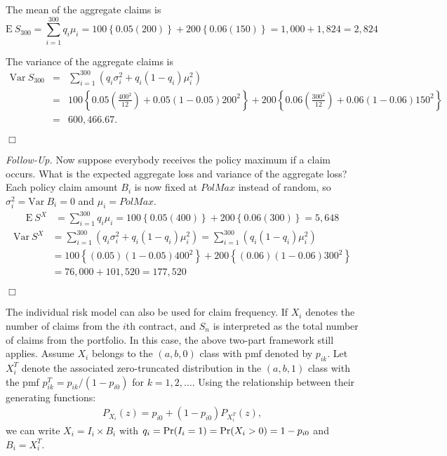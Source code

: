 \documentclass[12pt,letterpaper]{article}
\begin{document}
\noindent The mean of the aggregate claims is
$$\mathrm{E~} S_{300} = \sum_{i=1}^{300} q_i \mu_i = 100\left\{0.05(200)\right\} + 200\left\{0.06 (150) \right\} = 1,000+1,824 =
2,824$$

\noindent The variance of the aggregate claims is
\begin{eqnarray*}
	\mathrm{Var~}S_{300} &=& \sum_{i=1}^{300} \left( q_i \sigma _i^2+q_i (1-q_i
	)\mu_i^2 \right) \\
	&=& 100\left\{ 0.05 \left(\frac{400^2}{12}\right) +0.05 (1-0.05 )200^2 \right\}+
	200\left\{
	0.06 \left(\frac{300^2}{12}\right) +0.06 (1-0.06 )150^2 \right\}\\
	&=& 600,466.67 .
\end{eqnarray*}
\begin{flushright}$\Box$\end{flushright}

\noindent \textit{Follow-Up.} Now suppose everybody receives the policy maximum if a claim occurs. What is the expected aggregate loss and variance of the aggregate loss? Each policy claim amount $B_i$ is now fixed at $PolMax$ instead of random, so $\sigma_i^2 = \mathrm{Var~} B_i = 0$ and $\mu_i = PolMax$.
\begin{align*}
\mathrm{E~}S^X &= \sum_{i=1}^{300} q_i \mu_i = 100 \left\{0.05(400) \right\} + 200 \left\{ 0.06(300) \right\} = 5,648
\end{align*}
\begin{align*}
\mathrm{Var~}S^X &= \sum_{i=1}^{300} \left( q_i \sigma _i^2+q_i (1-q_i
)\mu_i^2 \right) = \sum_{i=1}^{300} \left( q_i (1-q_i) \mu_i^2 \right) \\
&= 100 \left\{(0.05) (1-0.05) 400^2\right\} +
200 \left\{(0.06) (1-0.06)300^2\right\} \\
&= 76,000 + 101,520 = 177,520
\end{align*}
\begin{flushright}$\Box$\end{flushright}

The individual risk model can also be used for claim frequency. If $X_i$ denotes the number of claims from the $i$th contract, and $S_n$ is interpreted as the total number of claims from the portfolio. In this case, the above two-part framework still applies. Assume $X_i$ belongs to the $(a,b,0)$ class with pmf denoted by $p_{ik}$. Let $X_i^{T}$ denote the associated zero-truncated distribution in the $(a,b,1)$ class with the pmf $p_{ik}^T=p_{ik}/(1-p_{i0})$ for $k=1,2,\ldots$. Using the relationship between their generating functions:
\begin{align*}
P_{X_i}(z) = p_{i0} +(1-p_{i0}) P_{X_i^{T}}(z),
\end{align*}
we can write $X_i=I_i\times B_i$ with $q_i={\rm Pr}(I_i=1)={\rm Pr}(X_i>0)=1-p_{i0}$ and $B_i=X_i^T$.\\
\end{document}
